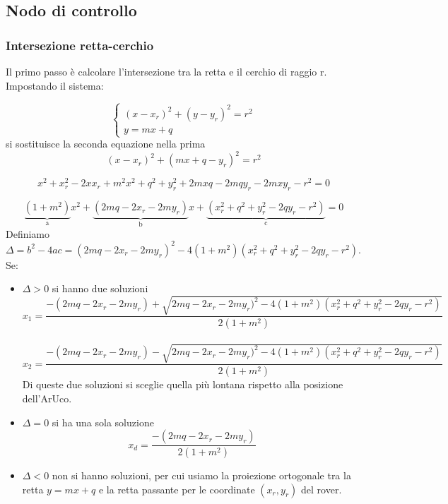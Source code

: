 \subsection{Nodo di controllo}
\subsubsection{Intersezione retta-cerchio}
Il primo passo è calcolare l'intersezione tra la retta e il cerchio di raggio r. Impostando il sistema:

\begin{equation} 
\begin{cases}

    (x-x_r)^2+(y-y_r)^2=r^2
   \\
    y=mx+q 
  \end{cases} 
\end{equation}
si sostituisce la seconda equazione nella prima
\begin{equation}
(x-x_r)^2+(mx+q-y_r)^2=r^2
\end{equation}

\begin{equation}
x^2+x_r^2-2xx_r+m^2x^2+q^2+y_r^2+2mxq-2mqy_r-2mxy_r-r^2=0
\end{equation}

\begin{equation}
\underbrace{(1+m^2)}_\text{a}x^2+\underbrace{(2mq-2x_r-2my_r)}_\text{b}x+\underbrace{(x_r^2+q^2+y_r^2-2qy_r-r^2)}_\text{c}=0
\end{equation}
Definiamo $\Delta=b^2-4ac=(2mq-2x_r-2my_r)^2-4(1+m^2)(x_r^2+q^2+y_r^2-2qy_r-r^2)$. \\Se:
\begin{itemize}
    \item $\Delta>0$ si hanno due soluzioni
        \begin{equation}
        x_1=\frac{-(2mq-2x_r-2my_r)+\sqrt{2mq-2x_r-2my_r)^2-4(1+m^2)(x_r^2+q^2+y_r^2-2qy_r-r^2)}}{2(1+m^2)}
        \end{equation}
        \\
        \begin{equation}
        x_2=\frac{-(2mq-2x_r-2my_r)-\sqrt{2mq-2x_r-2my_r)^2-4(1+m^2)(x_r^2+q^2+y_r^2-2qy_r-r^2)}}{2(1+m^2)}
        \end{equation}
        Di queste due soluzioni si sceglie quella più lontana rispetto alla posizione dell'ArUco.
    \item $\Delta=0$ si ha una sola soluzione
    \begin{equation}
        x_d=\frac{-(2mq-2x_r-2my_r)}{2(1+m^2)}
        \end{equation}
    \item $\Delta<0$ non si hanno soluzioni, per cui usiamo la proiezione ortogonale tra la retta $y=mx+q$ e la retta passante per le coordinate $(x_r, y_r)$ del rover.
\end{itemize}




